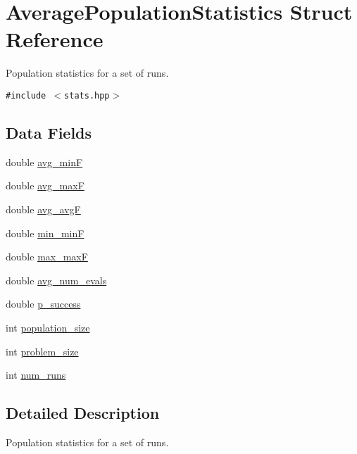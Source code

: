 \hypertarget{struct_average_population_statistics}{
\section{Average\-Population\-Statistics Struct Reference}
\label{struct_average_population_statistics}
}
Population statistics for a set of runs.  


{\tt \#include $<$stats.hpp$>$}

\subsection*{Data Fields}
\begin{CompactItemize}
\item 
double \hyperlink{struct_average_population_statistics_eb91d551ff5f30d3001cbace5e0ff8ac}{avg\_\-min\-F}
\item 
double \hyperlink{struct_average_population_statistics_d270701a3171454454a071b48bcd4eff}{avg\_\-max\-F}
\item 
double \hyperlink{struct_average_population_statistics_b1934683b4113985dc3b08b2abc8cc34}{avg\_\-avg\-F}
\item 
double \hyperlink{struct_average_population_statistics_9e747b4448fa835def23ea219f1dc334}{min\_\-min\-F}
\item 
double \hyperlink{struct_average_population_statistics_cce6ed392d71b6ab68af1178f7185b89}{max\_\-max\-F}
\item 
double \hyperlink{struct_average_population_statistics_858bca094b4aa5b003a73674a5fbd805}{avg\_\-num\_\-evals}
\item 
double \hyperlink{struct_average_population_statistics_186c0b9123aaeb087bac7a5acbd2e4e3}{p\_\-success}
\item 
int \hyperlink{struct_average_population_statistics_489a8d8acbd86a92f5e43ee2a2016222}{population\_\-size}
\item 
int \hyperlink{struct_average_population_statistics_69ff50e9cdd8050d91884516958c9b28}{problem\_\-size}
\item 
int \hyperlink{struct_average_population_statistics_e4f9ec7ed6bc9f924fa740a141478797}{num\_\-runs}
\end{CompactItemize}


\subsection{Detailed Description}
Population statistics for a set of runs. 



